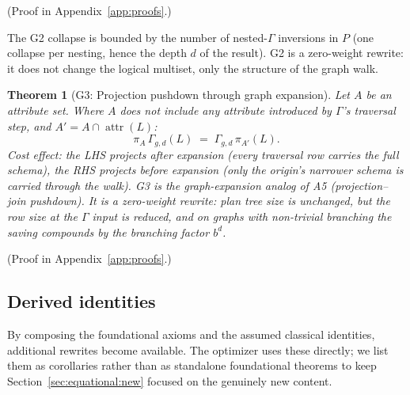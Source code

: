 \documentclass[sigconf]{acmart}
\theoremstyle{plain}
\newtheorem{theorem}{Theorem}
\theoremstyle{definition}
\newcommand{\attr}[1]{\operatorname{attr}(#1)}
\theoremstyle{remark}
\begin{document}
  (Proof in Appendix~\ref{app:proofs}.)

The G2 collapse is bounded by the number of nested-$\Gamma$
inversions in $P$ (one collapse per nesting, hence the depth $d$
of the result). G2 is a zero-weight rewrite: it does not change
the logical multiset, only the structure of the graph walk.

\begin{theorem}[G3: Projection pushdown through graph expansion]\label{thm:g3}
Let $A$ be an attribute set. Where $A$ does not include any
attribute introduced by $\Gamma$'s traversal step, and
$A' = A \cap \attr{L}$:
\[
\pi_A\, \Gamma_{g, d}(L)
\;=\;
\Gamma_{g, d}\, \pi_{A'}(L).
\]
\emph{Cost effect:} the LHS projects after expansion (every
traversal row carries the full schema), the RHS projects before
expansion (only the origin's narrower schema is carried through
the walk). G3 is the graph-expansion analog of A5
(projection--join pushdown). It is a zero-weight rewrite: plan
tree size is unchanged, but the row size at the $\Gamma$ input
is reduced, and on graphs with non-trivial branching the
saving compounds by the branching factor $b^d$.
\end{theorem}

  (Proof in Appendix~\ref{app:proofs}.)

\subsection{Derived identities}\label{sec:equational:derived}

By composing the foundational axioms and the assumed classical
identities, additional rewrites become available. The optimizer
uses these directly; we list them as corollaries rather than as
standalone foundational theorems to keep
Section~\ref{sec:equational:new} focused on the genuinely new
content.
\end{document}
